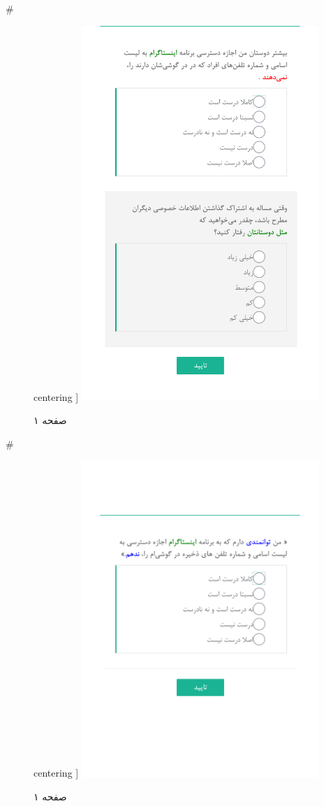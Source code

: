 { 
 # 
\begin{figure}[htpb]
centering ]
\includegraphics[width=0.8\textwidth]{./img/Task52.png/}
\caption{صفحه ۱}
\label{fig:Task1}
\end{figure}
 
 
 # 
\begin{figure}[htpb]
centering ]
\includegraphics[width=0.8\textwidth]{./img/Task53.png/}
\caption{صفحه ۱}
\label{fig:Task1}
\end{figure}
 
}
